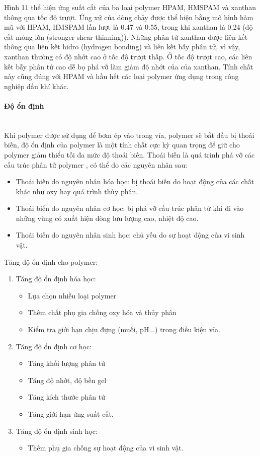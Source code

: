 \documentclass[12pt,a4paper]{article}
\newcommand{\subsubsubsection}[1]{\paragraph{#1}\mbox{}\\}
\begin{document}
	\newline
	Hình 11 thể hiện ứng suất cắt của ba loại polymer HPAM, HMSPAM và xanthan thông qua tốc độ trượt. Ứng xử của dòng chảy được thể hiện bằng mô hình hàm mũ với HPAM, HMSPAM lần lượt là 0.47 và 0.55, trong khi xanthan là 0.24 (độ cắt mỏng lớn (stronger shear-thinning)). Những phân tử xanthan được liên kết thông qua liên kết hidro (hydrogen bonding) và liên kết bẫy phân tử, vì vậy, xanthan thường có độ nhớt cao ở tốc độ trượt thấp. Ở tốc độ trượt cao, các liên kết bẫy phân tử cao dễ bọ phá vỡ làm giảm độ nhớt của của xanthan. Tính chất này cũng đúng với HPAM và hầu hết các loại polymer ứng dụng trong công nghiệp dầu khí khác.
	\subsubsubsection{Độ ổn định}	
	Khi polymer được sử dụng để bơm ép vào trong vỉa, polymer sẽ bắt đầu bị thoái biến, độ ổn định của polymer là một tính chất cực kỳ quan trọng để giữ cho polymer giảm thiểu tối đa mức độ thoái biến. Thoái biến là quá trình phá vỡ các cấu trúc phân tử polymer \cite{sorbie2013polymer}, có thể do các nguyên nhân sau:
		\begin{itemize}
			\item Thoái biến do nguyên nhân hóa học: bị thoái biến do hoạt động của các chất khác như oxy hay quá trình thủy phân.
			\item Thoái biến do nguyên nhân cơ học: bị phá vỡ cấu trúc phân tử khi đi vào những vùng có xuất hiện dòng lưu lượng cao, nhiệt độ cao.
			\item Thoái biến do nguyên nhân sinh học: chủ yếu do sự hoạt động của vi sinh vật.
		\end{itemize}
	Tăng độ ổn định cho polymer:
		\begin{enumerate}
			\item Tăng độ ổn định hóa học:
			\begin{itemize}
				\item Lựa chọn nhiều loại polymer
				\item Thêm chất phụ gia chống oxy hóa và thủy phân
				\item Kiểm tra giới hạn chịu đựng (muối, pH...) trong điều kiện vỉa.
			\end{itemize}
			\item Tăng độ ổn định cơ học:
			\begin{itemize}
				\item Tăng khối lượng phân tử
				\item Tăng độ nhớt, độ bền gel
				\item Tăng kích thước phân tử
				\item Tăng giới hạn ứng suất cắt.
			\end{itemize}
			\item Tăng độ ổn định sinh học:
			\begin{itemize}
				\item Thêm phụ gia chống sự hoạt động của vi sinh vật.
			\end{itemize}
		\end{enumerate}
\end{document}
